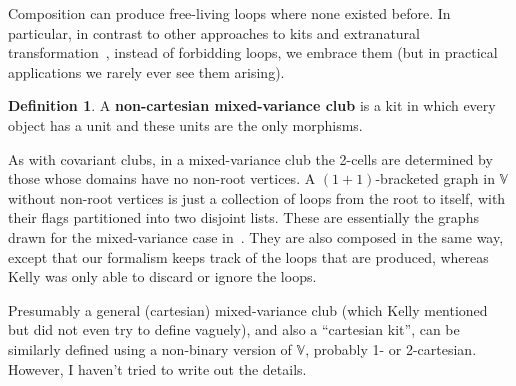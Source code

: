 \documentclass{article}
\theoremstyle{definition}
\newtheorem{defn}[thm]{Definition}
\theoremstyle{remark}
\def\vhy{\mathbb{V}}
\begin{document}
Composition can produce free-living loops where none existed before.
In particular, in contrast to other approaches to kits and extranatural transformation~\cite{ek:gen-funct-calc}, instead of forbidding loops, we embrace them (but in practical applications we rarely ever see them arising).

\begin{defn}
  A \textbf{non-cartesian mixed-variance club} is a kit in which every object has a unit and these units are the only morphisms.
\end{defn}

As with covariant clubs, in a mixed-variance club the 2-cells are determined by those whose domains have no non-root vertices.
A $(1+1)$-bracketed graph in $\vhy$ without non-root vertices is just a collection of loops from the root to itself, with their flags partitioned into two disjoint lists.
These are essentially the graphs drawn for the mixed-variance case in~\cite{kelly:mv-funct-calc,kelly:abst-coh}.
They are also composed in the same way, except that our formalism keeps track of the loops that are produced, whereas Kelly was only able to discard or ignore the loops.

Presumably a general (cartesian) mixed-variance club (which Kelly mentioned but did not even try to define vaguely), and also a ``cartesian kit'', can be similarly defined using a non-binary version of $\vhy$, probably 1- or 2-cartesian.
However, I haven't tried to write out the details.




\end{document}
